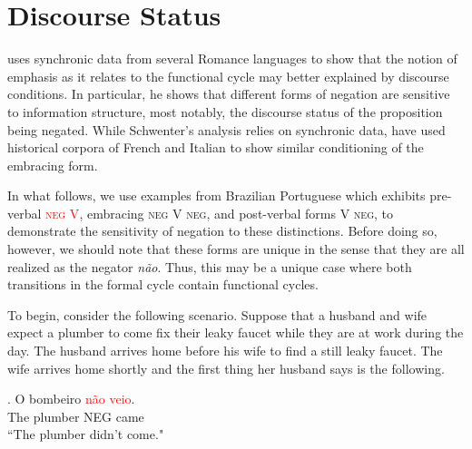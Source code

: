 \documentclass[12pt]{upenndiss}
\theoremstyle{definition} \newtheorem{definition}{Definition}
\begin{document}
\section{Discourse Status}

\cite{schwenter2005,schwenter2006} uses synchronic data from several Romance languages to show that the notion of emphasis as it relates to the functional cycle may better explained by discourse conditions. In particular, he shows that different forms of negation are sensitive to information structure, most notably, the discourse status of the proposition being negated. While Schwenter's analysis relies on synchronic data, \cite{hansen2009, hansen-visconti2009,hansen-visconti2012} have used historical corpora of French and Italian to show similar conditioning of the embracing form. 


In what follows, we use examples from Brazilian Portuguese which exhibits pre-verbal \textsc{\textcolor{red}{neg V}}, embracing  \textsc{\color{blue} neg V neg}, and post-verbal forms \textsc{\color{green} V neg}, to demonstrate the sensitivity of negation to these distinctions. Before doing so, however, we should note that these forms are unique in the sense that they are all realized as the negator \emph{n{\~a}o}.  Thus, this may be a unique case where both transitions in the formal cycle contain functional cycles.

To begin, consider the following scenario. Suppose that a husband and wife expect a plumber to come fix their leaky faucet while they are at work during the day. The husband arrives home before his wife to find a still leaky faucet. The wife arrives home shortly and the first thing her husband says is the following.



\exg.  O bombeiro \textcolor{red}{ n{\~a}o} \textcolor{red}{veio}.\\
         The plumber NEG came\\
         ``The plumber didn't come."\\
\end{document}
